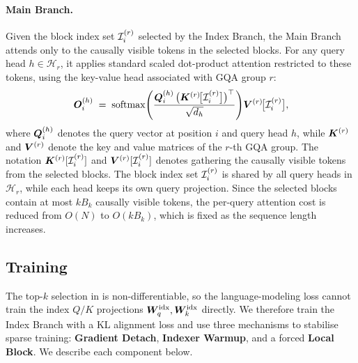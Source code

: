 \paragraph{Main Branch.} Given the block index set ${\mathcal{I}}_i^{(r)}$ selected by the Index Branch, the Main Branch attends only to the causally visible tokens in the selected blocks. For any query head $h \in \mathcal{H}_r$, it applies standard scaled dot-product attention restricted to these tokens, using the key-value head associated with GQA group $r$:
\begin{equation}
\label{eq:msa-sparse-attn}
{\bm{O}}_{i}^{(h)}
\;=\;
\mathrm{softmax}\Biggl(
  \frac{{\bm{Q}}_{i}^{(h)}\,
        \bigl({\bm{K}}^{(r)}\!\bigl[{\mathcal{I}}_i^{(r)}\bigr]\bigr)^{\top}}
       {\sqrt{d_h}}
\Biggr)
{\bm{V}}^{(r)}\!\bigl[{\mathcal{I}}_i^{(r)}\bigr],
\end{equation}
where ${\bm{Q}}_{i}^{(h)}$ denotes the query vector at position $i$ and query head $h$, while ${\bm{K}}^{(r)}$ and ${\bm{V}}^{(r)}$ denote the key and value matrices of the $r$-th GQA group.
The notation ${\bm{K}}^{(r)}[{\mathcal{I}}_i^{(r)}]$ and ${\bm{V}}^{(r)}[{\mathcal{I}}_i^{(r)}]$ denotes gathering the causally visible tokens from the selected blocks.
The block index set ${\mathcal{I}}_i^{(r)}$ is shared by all query heads in $\mathcal{H}_r$, while each head keeps its own query projection. Since the selected blocks contain at most $kB_k$ causally visible tokens, the per-query attention cost is reduced from $O(N)$ to $O(kB_k)$, which is fixed as the sequence length increases.

\subsection{Training}
\label{sec:method-training}

The top-$k$ selection in  is non-differentiable, so the language-modeling loss cannot train the index $Q/K$ projections ${\bm{W}}^{\rm idx}_q, {\bm{W}}^{\rm idx}_k$ directly. We therefore train the Index Branch with a KL alignment loss and use three mechanisms to stabilise sparse training: \textbf{Gradient Detach}, \textbf{Indexer Warmup}, and a forced \textbf{Local Block}. We describe each component below.



